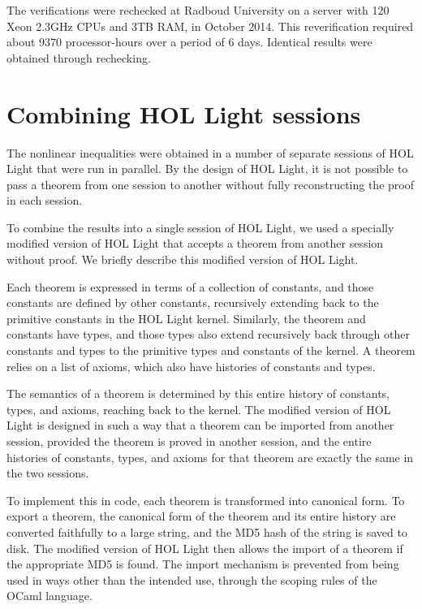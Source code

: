 The verifications were rechecked at Radboud University on a server
with 120 Xeon 2.3GHz CPUs and 3TB RAM, in October 2014.  This
reverification required about 9370 processor-hours over a period of 6
days.  Identical results were obtained through rechecking.



\section{Combining HOL Light sessions}


The nonlinear inequalities were obtained in a number of separate sessions
of HOL Light that were run in parallel.  By the design of HOL Light, it
is not possible to pass a theorem from one session to another without
fully reconstructing the proof in each session.  

To combine the results into a single session of HOL Light, we used a
specially modified version of HOL Light that accepts a theorem from
another session without proof.  We briefly describe this modified
version of HOL Light.

Each theorem is expressed in terms of a collection of constants, and
those constants are defined by other constants, recursively extending
back to the primitive constants in the HOL Light kernel.  Similarly,
the theorem and constants have types, and those types also extend
recursively back through other constants and types to the primitive
types and constants of the kernel.  A theorem relies on a list of
axioms, which also have histories of constants and types.

The semantics of a theorem is determined by this entire history of
constants, types, and axioms, reaching back to the kernel.  The
modified version of HOL Light is designed in such a way that a theorem
can be imported from another session, provided the theorem is proved
in another session, and the entire histories of constants, types, and
axioms for that theorem are exactly the same in the two sessions.

To implement this in code, each theorem is transformed into canonical
form.  To export a theorem, the canonical form of the theorem and its
entire history are converted faithfully to a large string, and the MD5
hash of the string is saved to disk.  The modified version of HOL
Light then allows the import of a theorem if the appropriate MD5 is
found.  The import mechanism is prevented from being used in ways
other than the intended use, through the scoping rules of the OCaml
language.  


